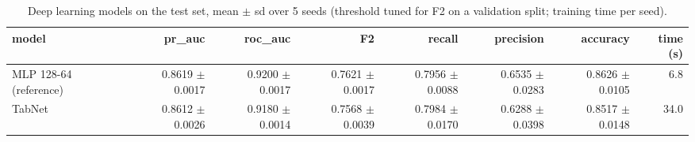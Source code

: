 \begin{table}[H]
\centering
\small
\begin{adjustbox}{max width=\linewidth}
\begin{tabular}{lrrrrrrr}
\toprule
model & pr\_auc & roc\_auc & F2 & recall & precision & accuracy & time (s) \\
\midrule
MLP 128-64 (reference) & 0.8619 $\pm$ 0.0017 & 0.9200 $\pm$ 0.0017 & 0.7621 $\pm$ 0.0017 & 0.7956 $\pm$ 0.0088 & 0.6535 $\pm$ 0.0283 & 0.8626 $\pm$ 0.0105 & 6.8 \\
TabNet & 0.8612 $\pm$ 0.0026 & 0.9180 $\pm$ 0.0014 & 0.7568 $\pm$ 0.0039 & 0.7984 $\pm$ 0.0170 & 0.6288 $\pm$ 0.0398 & 0.8517 $\pm$ 0.0148 & 34.0 \\
\bottomrule
\end{tabular}
\end{adjustbox}
\caption{Deep learning models on the test set, mean $\pm$ sd over 5 seeds (threshold tuned for F2 on a validation split; training time per seed).}
\label{tab:deep}
\end{table}
